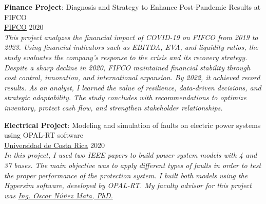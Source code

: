     \begin{tcolorbox}[title=Projects \faLightbulb,colframe=blue!25!black]


        \textbf{Finance Project}: Diagnosis and Strategy to Enhance Post-Pandemic Results at FIFCO\\
        \faMapMarker \hspace{0mm} \href{https://www.fifco.com/}{FIFCO} \hspace{13.7cm} \faCalendar \hspace{0mm} 2020\\
        \textit{This project analyzes the financial impact of COVID-19 on FIFCO from 2019 to 2023. Using financial indicators such as EBITDA, EVA, and liquidity ratios, the study evaluates the company’s response to the crisis and its recovery strategy. Despite a sharp decline in 2020, FIFCO maintained financial stability through cost control, innovation, and international expansion. By 2022, it achieved record results. As an analyst, I learned the value of resilience, data-driven decisions, and strategic adaptability. The study concludes with recommendations to optimize inventory, protect cash flow, and strengthen stakeholder relationships.}
        
        
        \tcbline




        \textbf{Electrical Project}: Modeling and simulation of faults on electric power systems using OPAL-RT software\\
        \faMapMarker \hspace{0mm} \href{https://www.ucr.ac.cr/}{Universidad de Costa Rica} \hspace{10.70cm} \faCalendar \hspace{0mm} 2020\\
        \textit{In this project, I used two IEEE papers to build power system models with 4 and 37 buses. The main objective was to apply different types of faults in order to test the proper performance of the protection system. I built both models using the Hypersim software, developed by OPAL-RT. My faculty advisor for this project was \href{https://eie.ucr.ac.cr/profesores/oscar.nunez/}{Ing. Oscar Núñez Mata, PhD.}}    
        
        
        \tcbline
        

\end{tcolorbox}
